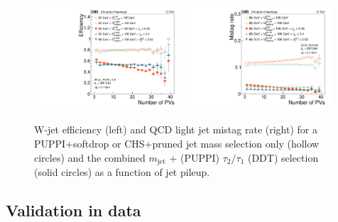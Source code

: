 \begin{figure}[htbp]
\centering
\includegraphics[width=0.49\textwidth]{figures/vtagging/JME-16-003/BoostedW/WtagSigEffvsNPV.pdf}
\includegraphics[width=0.49\textwidth]{figures/vtagging/JME-16-003/BoostedW/QCDBkgEffvsNPV.pdf}
\caption{W-jet efficiency (left) and QCD light jet mistag rate (right) for a PUPPI+softdrop or CHS+pruned jet mass selection only (hollow circles) and the combined $m_{\mathrm{jet}}$ + (PUPPI) $\tau_2/\tau_1$ (DDT) selection (solid circles) as a function of jet pileup.}
\label{fig:searchII:effvspu}
\end{figure}

   
\subsection{Validation in data}  
  

